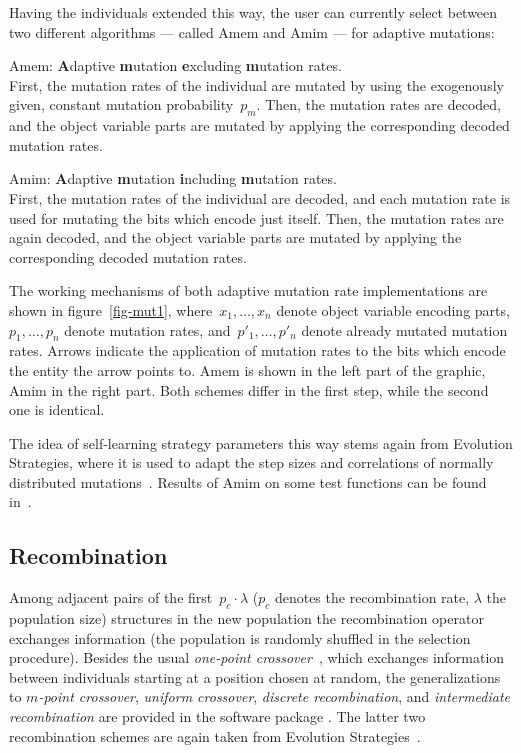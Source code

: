 Having the individuals extended this way, the user can currently select between
two different algorithms --- called {\sc Amem} and {\sc Amim} ---
for adaptive mutations:
%
\begin{Itemize}
%
\item	{\sc Amem}: {\bf A}daptive {\bf m}utation {\bf e}xcluding 
	{\bf m}utation rates.						\\
	First, the mutation rates of the individual are mutated by using 
	the exogenously given, constant mutation probability~$p_m$.
	Then, the mutation rates are decoded, and the object variable parts
	are mutated by applying the corresponding decoded mutation rates.
%
\item	{\sc Amim}: {\bf A}daptive {\bf m}utation {\bf i}ncluding 
	{\bf m}utation rates.						\\
	First, the mutation rates of the individual are decoded, and 
	each mutation rate is used for mutating the bits which encode just
	itself.
	Then, the mutation rates are again decoded, and the object 
	variable parts are mutated by applying the corresponding 
	decoded mutation rates.
%
\end{Itemize}

The working mechanisms of both adaptive mutation rate implementations are
shown in figure~\ref{fig-mut1}, where~$x_1,\ldots,x_n$ denote object 
variable encoding parts, $p_1,\ldots,p_n$ denote mutation rates, 
and~$p'_1,\ldots,p'_n$ denote already mutated mutation rates.
Arrows indicate the application of mutation rates to the bits which
encode the entity the arrow points to.
{\sc Amem} is shown in the left part of the graphic, {\sc Amim} in the
right part.
Both schemes differ in the first step, while the second one is identical.


The idea of self-learning strategy parameters this way stems again 
from Evolution Strategies, where it is used to adapt the step sizes
and correlations of normally distributed mutations~\cite{Schw88}.
Results of {\sc Amim} on some test functions can be found in~\cite{Bae91b}.

\subsection{Recombination} 

Among adjacent pairs of the first~$p_c \cdot \lambda$ ($p_c$ denotes
the recombination rate, $\lambda$ the population size) structures in the
new population the recombination operator exchanges information (the 
population is randomly shuffled in the selection procedure).
Besides the usual {\em one-point crossover\/}~\cite{Hol75}, which exchanges
information between individuals starting at a position chosen at random, the
generalizations to {\em $m$-point crossover\/}, {\em uniform crossover\/},
{\em discrete recombination\/}, and {\em intermediate recombination\/}
are provided in the software package \GEN.
The latter two recombination schemes are again taken from Evolution 
Strategies~\cite{Schw81}.

